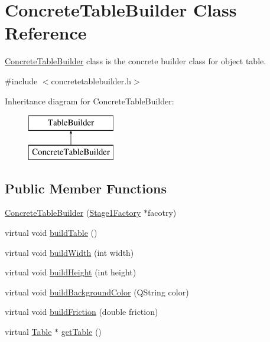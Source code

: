 \hypertarget{class_concrete_table_builder}{}\section{Concrete\+Table\+Builder Class Reference}
\label{class_concrete_table_builder}


\mbox{\hyperlink{class_concrete_table_builder}{Concrete\+Table\+Builder}} class is the concrete builder class for object table.  




{\ttfamily \#include $<$concretetablebuilder.\+h$>$}

Inheritance diagram for Concrete\+Table\+Builder\+:\begin{figure}[H]
\begin{center}
\leavevmode
\includegraphics[height=2.000000cm]{class_concrete_table_builder}
\end{center}
\end{figure}
\subsection*{Public Member Functions}
\begin{DoxyCompactItemize}
\item 
\mbox{\hyperlink{class_concrete_table_builder_aff8b7c167d68b9e71c18888136b53034}{Concrete\+Table\+Builder}} (\mbox{\hyperlink{class_stage1_factory}{Stage1\+Factory}} $\ast$facotry)
\item 
virtual void \mbox{\hyperlink{class_concrete_table_builder_af49b5e371e6f725303e4b2f011d20fad}{build\+Table}} ()
\item 
virtual void \mbox{\hyperlink{class_concrete_table_builder_a154545f9b286b6a9ccff09a28c7a644d}{build\+Width}} (int width)
\item 
virtual void \mbox{\hyperlink{class_concrete_table_builder_a3e72d6d46e47146e385fff3937718a13}{build\+Height}} (int height)
\item 
virtual void \mbox{\hyperlink{class_concrete_table_builder_a547c26af597d109dbaf9b4de32f041a9}{build\+Background\+Color}} (Q\+String color)
\item 
virtual void \mbox{\hyperlink{class_concrete_table_builder_aab2c2ff234def292f7ead072dd5fda60}{build\+Friction}} (double friction)
\item 
virtual \mbox{\hyperlink{class_table}{Table}} $\ast$ \mbox{\hyperlink{class_concrete_table_builder_a0c1d21df18d11686736b84929deb669e}{get\+Table}} ()
\end{DoxyCompactItemize}
